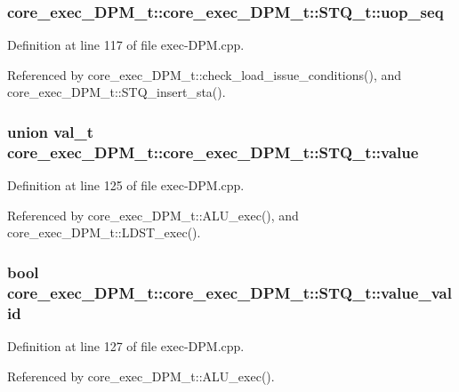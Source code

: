 \subsubsection[{uop\_\-seq}]{ core\_\-exec\_\-DPM\_\-t::core\_\-exec\_\-DPM\_\-t::STQ\_\-t::uop\_\-seq}\label{structcore__exec__DPM__t_1_1STQ__t_f75e13d26a4ebba3da425d142902811c}




Definition at line 117 of file exec-DPM.cpp.

Referenced by core\_\-exec\_\-DPM\_\-t::check\_\-load\_\-issue\_\-conditions(), and core\_\-exec\_\-DPM\_\-t::STQ\_\-insert\_\-sta().
\subsubsection[{value}]{\setlength{\rightskip}{0pt plus 5cm}union {\bf val\_\-t} core\_\-exec\_\-DPM\_\-t::core\_\-exec\_\-DPM\_\-t::STQ\_\-t::value\hspace{0.3cm}{\tt  [write]}}\label{structcore__exec__DPM__t_1_1STQ__t_35a655b6baeb594e50ec6df0dbadaa1d}




Definition at line 125 of file exec-DPM.cpp.

Referenced by core\_\-exec\_\-DPM\_\-t::ALU\_\-exec(), and core\_\-exec\_\-DPM\_\-t::LDST\_\-exec().
\subsubsection[{value\_\-valid}]{\setlength{\rightskip}{0pt plus 5cm}bool core\_\-exec\_\-DPM\_\-t::core\_\-exec\_\-DPM\_\-t::STQ\_\-t::value\_\-valid}\label{structcore__exec__DPM__t_1_1STQ__t_8f487108e9e9fef004abc9b617bf604d}




Definition at line 127 of file exec-DPM.cpp.

Referenced by core\_\-exec\_\-DPM\_\-t::ALU\_\-exec().
